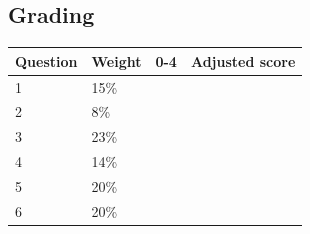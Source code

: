 \documentclass[a4paper,12pt]{book}
\begin{document}
    \subsection*{Grading}
    
    \begin{center}
        
        \begin{tabular}{ | l | l | l | l | }
            \hline
            \textbf{ Question } & \textbf{ Weight } & \textbf{ 0-4 } & \textbf{ Adjusted score }
            \\ \hline
            
            1 & 15\% & &    \\ \hline
            
            2 & 8\% & &    \\ \hline
            
            3 & 23\% & &    \\ \hline
            
            4 & 14\% & &    \\ \hline
            
            5 & 20\% & &    \\ \hline
            
            6 & 20\% & &    \\ \hline
            
            
        \end{tabular}
    \end{center}
    
\end{document}
